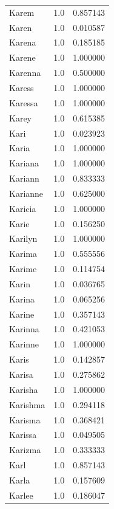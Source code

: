 \documentclass[
  letterpaper,
  DIV=11,
  numbers=noendperiod]{scrreprt}
\begin{document}
\begin{tabular}{lrr}
Karem           &   1.0 &   0.857143 \\
Karen           &   1.0 &   0.010587 \\
Karena          &   1.0 &   0.185185 \\
Karene          &   1.0 &   1.000000 \\
Karenna         &   1.0 &   0.500000 \\
Karess          &   1.0 &   1.000000 \\
Karessa         &   1.0 &   1.000000 \\
Karey           &   1.0 &   0.615385 \\
Kari            &   1.0 &   0.023923 \\
Karia           &   1.0 &   1.000000 \\
Kariana         &   1.0 &   1.000000 \\
Kariann         &   1.0 &   0.833333 \\
Karianne        &   1.0 &   0.625000 \\
Karicia         &   1.0 &   1.000000 \\
Karie           &   1.0 &   0.156250 \\
Karilyn         &   1.0 &   1.000000 \\
Karima          &   1.0 &   0.555556 \\
Karime          &   1.0 &   0.114754 \\
Karin           &   1.0 &   0.036765 \\
Karina          &   1.0 &   0.065256 \\
Karine          &   1.0 &   0.357143 \\
Karinna         &   1.0 &   0.421053 \\
Karinne         &   1.0 &   1.000000 \\
Karis           &   1.0 &   0.142857 \\
Karisa          &   1.0 &   0.275862 \\
Karisha         &   1.0 &   1.000000 \\
Karishma        &   1.0 &   0.294118 \\
Karisma         &   1.0 &   0.368421 \\
Karissa         &   1.0 &   0.049505 \\
Karizma         &   1.0 &   0.333333 \\
Karl            &   1.0 &   0.857143 \\
Karla           &   1.0 &   0.157609 \\
Karlee          &   1.0 &   0.186047 \\

\end{tabular}
\end{document}
